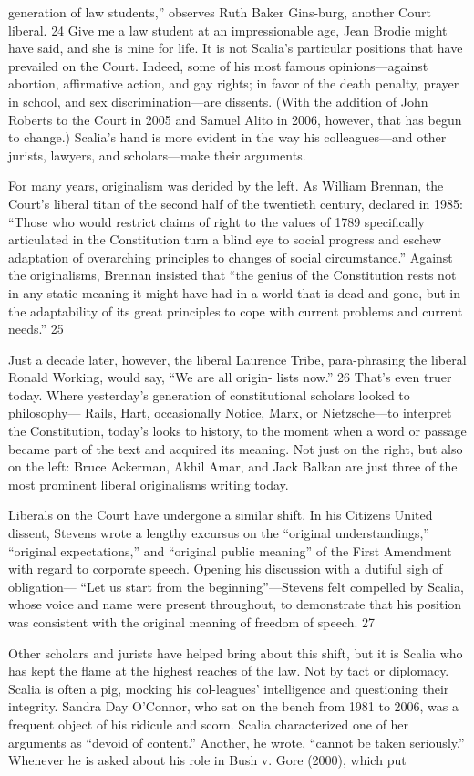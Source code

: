 generation of law students,” observes Ruth Baker Gins-burg, another Court liberal. {\color{blue} 24 } Give me a law student at an impressionable age, Jean Brodie might have said, and she is mine for life. It is not Scalia’s particular positions that have prevailed on the Court. Indeed, some of his most famous opinions—against abortion, affirmative action, and gay rights; in favor of the death penalty, prayer in school, and sex discrimination—are dissents. (With the addition of John Roberts to the Court in 2005 and Samuel Alito in 2006, however, that has begun to change.) Scalia’s hand is more evident in the way his colleagues—and other jurists, lawyers, and scholars—make their arguments.{\par} For many years, originalism was derided by the left. As William Brennan, the Court’s liberal titan of the second half of the twentieth century, declared in 1985: “Those who would restrict claims of right to the values of 1789 specifically articulated in the Constitution turn a blind eye to social progress and eschew adaptation of overarching principles to changes of social circumstance.” Against the originalisms, Brennan insisted that “the genius of the Constitution rests not in any static meaning it might have had in a world that is dead and gone, but in the adaptability of its great principles to cope with current problems and current needs.” {\color{blue} 25 } {\par} Just a decade later, however, the liberal Laurence Tribe, para-phrasing the liberal Ronald Working, would say, “We are all origin- lists now.” {\color{blue} 26 } That’s even truer today. Where yesterday’s generation of constitutional scholars looked to philosophy— Rails, Hart, occasionally Notice, Marx, or Nietzsche—to interpret the Constitution, today’s looks to history, to the moment when a word or passage became part of the text and acquired its meaning. Not just on the right, but also on the left: Bruce Ackerman, Akhil Amar, and Jack Balkan are just three of the most prominent liberal originalisms writing today.{\par} Liberals on the Court have undergone a similar shift. In his Citizens United dissent, Stevens wrote a lengthy excursus on the “original understandings,” “original expectations,” and “original public meaning” of the First Amendment with regard to corporate speech. Opening his discussion with a dutiful sigh of obligation— “Let us start from the beginning”—Stevens felt compelled by Scalia, whose voice and name were present throughout, to demonstrate that his position was consistent with the original meaning of freedom of speech. {\color{blue} 27 } {\par} Other scholars and jurists have helped bring about this shift, but it is Scalia who has kept the flame at the highest reaches of the law. Not by tact or diplomacy. Scalia is often a pig, mocking his col-leagues’ intelligence and questioning their integrity. Sandra Day O’Connor, who sat on the bench from 1981 to 2006, was a frequent object of his ridicule and scorn. Scalia characterized one of her arguments as “devoid of content.” Another, he wrote, “cannot be taken seriously.” Whenever he is asked about his role in Bush v. Gore (2000), which put 